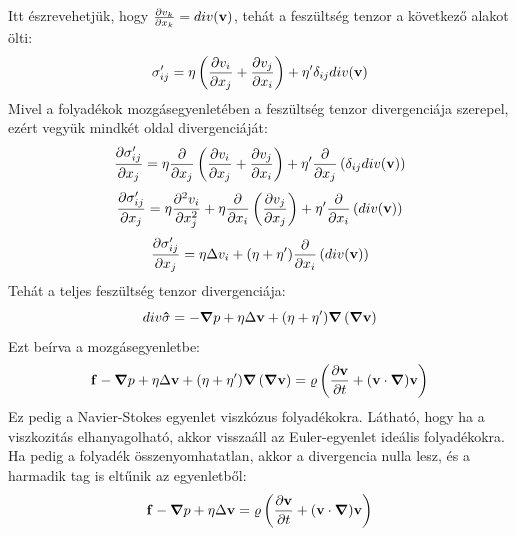 \documentclass[../main.tex]{subfiles}
\begin{document}
Itt észrevehetjük, hogy $\frac{\partial v_k}{\partial x_k} = div(\bold{v})$, tehát a feszültség tenzor a következő alakot ölti:
\begin{equation}
    \sigma_{ij}' = \eta \left(\frac{\partial v_i}{\partial x_j} + \frac{\partial v_j}{\partial x_i}\right) + \eta' \delta_{ij} div(\bold{v})
\end{equation}
Mivel a folyadékok mozgásegyenletében a feszültség tenzor divergenciája szerepel, ezért vegyük mindkét oldal divergenciáját:
\begin{equation}
    \frac{\partial \sigma_{ij}'}{\partial x_j} = \eta \frac{\partial}{\partial x_j} \left(\frac{\partial v_i}{\partial x_j} + \frac{\partial v_j}{\partial x_i}\right) + \eta' \frac{\partial}{\partial x_j} \left(\delta_{ij} div(\bold{v})\right)
\end{equation}
\begin{equation}
    \frac{\partial \sigma_{ij}'}{\partial x_j} = \eta \frac{\partial^2 v_i}{\partial x_j^2} + \eta \frac{\partial}{\partial x_i} \left(\frac{\partial v_j}{\partial x_j}\right) + \eta' \frac{\partial}{\partial x_i} \left(div(\bold{v})\right)
\end{equation}
\begin{equation}
    \frac{\partial \sigma_{ij}'}{\partial x_j} = \eta \Delta v_i + (\eta + \eta') \frac{\partial}{\partial x_i} \left(div(\bold{v})\right)
\end{equation}
Tehát a teljes feszültség tenzor divergenciája:
\begin{equation}
    div \bold{\hat{\sigma}} = - \boldsymbol{\nabla} p + \eta \Delta \bold{v} + (\eta + \eta')  \boldsymbol{\nabla}\left(\boldsymbol{\nabla} \bold{v}\right)
\end{equation}
Ezt beírva a mozgásegyenletbe:
\begin{equation}
    \bold{f} - \boldsymbol{\nabla} p + \eta \Delta \bold{v} + (\eta + \eta')  \boldsymbol{\nabla}\left(\boldsymbol{\nabla} \bold{v}\right) = \varrho \left(\frac{\partial \bold{v}}{\partial t} + (\bold{v} \cdot \boldsymbol{\nabla}) \bold{v}\right)
\end{equation}
Ez pedig a Navier-Stokes egyenlet viszkózus folyadékokra.
Látható, hogy ha a viszkozitás elhanyagolható, akkor visszaáll az Euler-egyenlet ideális folyadékokra. Ha pedig a folyadék összenyomhatatlan,
akkor a divergencia nulla lesz, és a harmadik tag is eltűnik az egyenletből:
\begin{equation}
    \bold{f} - \boldsymbol{\nabla} p + \eta \Delta \bold{v} = \varrho \left(\frac{\partial \bold{v}}{\partial t} + (\bold{v} \cdot \boldsymbol{\nabla}) \bold{v}\right)
\end{equation}
\end{document}

